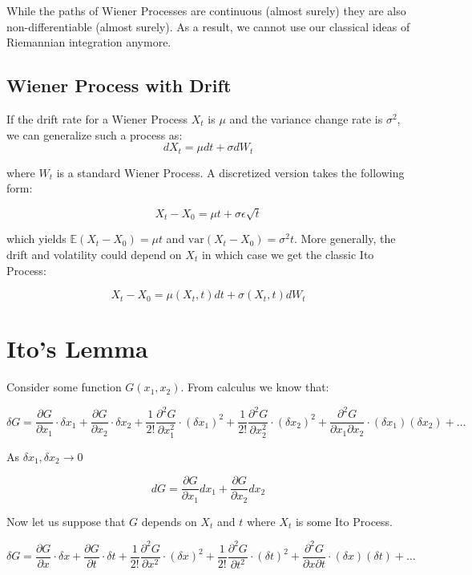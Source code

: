 \documentclass[11pt,]{article}
\begin{document}
While the paths of Wiener Processes are continuous (almost surely) they
are also non-differentiable (almost surely). As a result, we cannot use
our classical ideas of Riemannian integration anymore.

\subsection{Wiener Process with Drift}\label{wiener-process-with-drift}

If the drift rate for a Wiener Process \(X_t\) is \(\mu\) and the
variance change rate is \(\sigma^2\), we can generalize such a process
as: \[dX_t = \mu dt + \sigma dW_t\]

where \(W_t\) is a standard Wiener Process. A discretized version takes
the following form:

\[X_t-X_0 = \mu t+\sigma \epsilon \sqrt{t}\]

which yields \(\mathbb{E}(X_t-X_0)=\mu t\) and
\(\text{var}(X_t-X_0) = \sigma^2 t\). More generally, the drift and
volatility could depend on \(X_t\) in which case we get the classic Ito
Process:

\[X_t-X_0 = \mu(X_t, t) dt+ \sigma(X_t, t)dW_t\]

\section{Ito's Lemma}\label{itos-lemma}

Consider some function \(G(x_1, x_2)\). From calculus we know that:

\[\delta G = \frac{\partial G}{\partial x_1}\cdot \delta x_1 +
\frac{\partial G}{\partial x_2}\cdot \delta x_2 + 
\frac{1}{2!}\frac{\partial^2 G}{\partial x_1^2}\cdot (\delta x_1)^2 +
\frac{1}{2!}\frac{\partial^2 G}{\partial x_2^2}\cdot (\delta x_2)^2 +
\frac{\partial^2 G}{\partial x_1 \partial x_2}\cdot (\delta x_1)(\delta x_2) + \hdots
\]

As \(\delta x_1, \delta x_2\to 0\)

\[dG = \frac{\partial G}{\partial x_1}dx_1 + \frac{\partial G}{\partial x_2}dx_2\]

Now let us suppose that \(G\) depends on \(X_t\) and \(t\) where \(X_t\)
is some Ito Process.

\[\delta G = \frac{\partial G}{\partial x}\cdot \delta x +
\frac{\partial G}{\partial t}\cdot \delta t + 
\frac{1}{2!}\frac{\partial^2 G}{\partial x^2}\cdot (\delta x)^2 +
\frac{1}{2!}\frac{\partial^2 G}{\partial t^2}\cdot (\delta t)^2 +
\frac{\partial^2 G}{\partial x \partial t}\cdot (\delta x)(\delta t) + \hdots
\]
\end{document}
